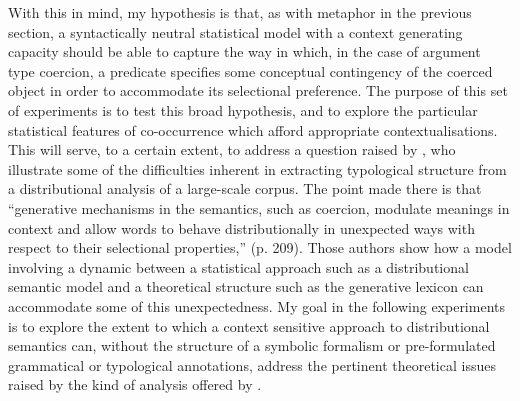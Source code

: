 With this in mind, my hypothesis is that, as with metaphor in the previous section, a syntactically neutral statistical model with a context generating capacity should be able to capture the way in which, in the case of argument type coercion, a predicate specifies some conceptual contingency of the coerced object in order to accommodate its selectional preference.  The purpose of this set of experiments \citep[an early version of which is reported in][]{McGregorEA2017} is to test this broad hypothesis, and to explore the particular statistical features of co-occurrence which afford appropriate contextualisations.  This will serve, to a certain extent, to address a question raised by \cite{PustejovskyEA2008}, who illustrate some of the difficulties inherent in extracting typological structure from a distributional analysis of a large-scale corpus.  The point made there is that ``generative mechanisms in the semantics, such as coercion, modulate meanings in context and allow words to behave distributionally in unexpected ways with respect to their selectional properties,'' (p. 209).  Those authors show how a model involving a dynamic between a statistical approach such as a distributional semantic model and a theoretical structure such as the generative lexicon can accommodate some of this unexpectedness.  My goal in the following experiments is to explore the extent to which a context sensitive approach to distributional semantics can, without the structure of a symbolic formalism or pre-formulated grammatical or typological annotations, address the pertinent theoretical issues raised by the kind of analysis offered by \citeauthor{PustejovskyEA2008}.

